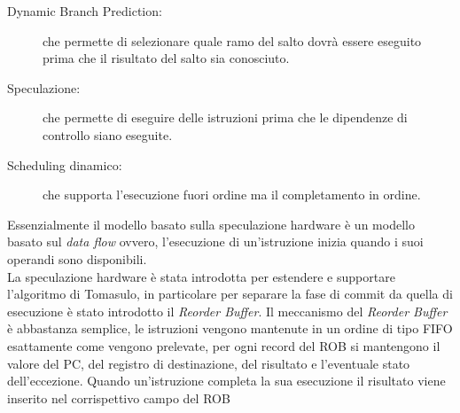 \begin{description}
\item[Dynamic Branch Prediction:] che permette di selezionare quale ramo del salto dovrà essere eseguito prima che il risultato del salto sia conosciuto.
\item[Speculazione:] che permette di eseguire delle istruzioni prima che le dipendenze di controllo siano eseguite.
\item[Scheduling dinamico:] che supporta l'esecuzione fuori ordine ma il completamento in ordine.
\end{description}
Essenzialmente il modello basato sulla speculazione hardware è un modello basato sul \emph{data flow} ovvero, l'esecuzione di un'istruzione inizia quando i suoi operandi sono disponibili.\\
La speculazione hardware è stata introdotta per estendere e supportare l'algoritmo di Tomasulo, in particolare per separare la fase di commit da quella di esecuzione è stato introdotto il \emph{Reorder Buffer}. 
Il meccanismo del \emph{Reorder Buffer} è abbastanza semplice, le istruzioni vengono mantenute in un ordine di tipo FIFO esattamente come vengono prelevate, per ogni record del ROB si mantengono il valore del PC, del registro di destinazione, del risultato e l'eventuale stato dell'eccezione. Quando un'istruzione completa la sua esecuzione il risultato viene inserito nel corrispettivo campo del ROB